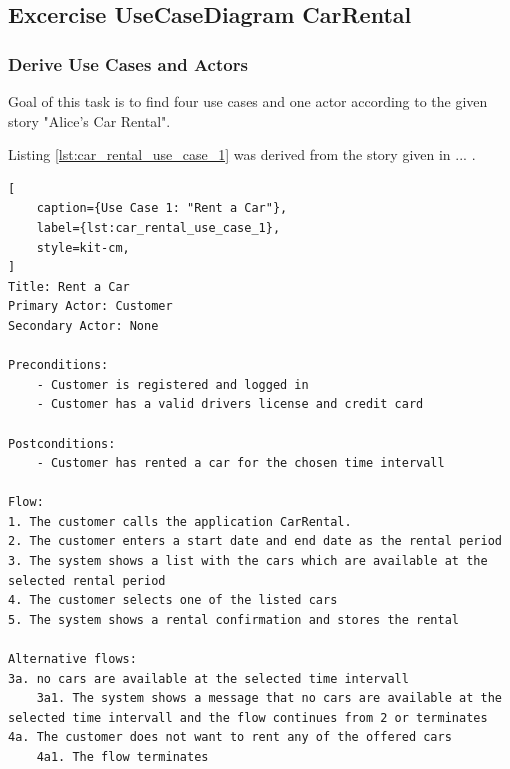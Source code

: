 \subsection{Excercise UseCaseDiagram CarRental}
\label{sec:exercise_use_case_diagram_car_rental}
\subsubsection*{Derive Use Cases and Actors}
Goal of this task is to find four use cases and one actor according to the given story "Alice's Car Rental".

Listing \ref{lst:car_rental_use_case_1} was derived from the story given in ... .

\begin{lstlisting}[
    caption={Use Case 1: "Rent a Car"},
    label={lst:car_rental_use_case_1},
    style=kit-cm,
]
Title: Rent a Car
Primary Actor: Customer
Secondary Actor: None

Preconditions:
    - Customer is registered and logged in
    - Customer has a valid drivers license and credit card

Postconditions:
    - Customer has rented a car for the chosen time intervall

Flow:
1. The customer calls the application CarRental.
2. The customer enters a start date and end date as the rental period
3. The system shows a list with the cars which are available at the selected rental period
4. The customer selects one of the listed cars
5. The system shows a rental confirmation and stores the rental

Alternative flows:
3a. no cars are available at the selected time intervall
    3a1. The system shows a message that no cars are available at the selected time intervall and the flow continues from 2 or terminates
4a. The customer does not want to rent any of the offered cars
    4a1. The flow terminates    
\end{lstlisting}




